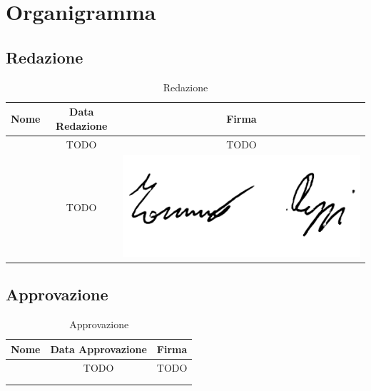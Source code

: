 \section{Organigramma}

\subsection{Redazione}

\renewcommand{\arraystretch}{1}
	\begin{table}[H]
		\begin{center}
			\setlength{\aboverulesep}{0pt}
			\setlength{\belowrulesep}{0pt}
			\setlength{\extrarowheight}{.75ex}
			\begin{tabular}{ c c c }
				\rowcolor{AzzurroGruppo!30} 
				\textbf{Nome} & \textbf{Data Redazione} & \textbf{Firma} \\
				\toprule
				
				\Matteo{} & TODO & TODO \\
                \Tommaso{} & TODO & \includegraphics[scale = 0.5]{components/img/firme_membri/firma-tp.png} \\
				
				\bottomrule
			\end{tabular}
			\caption{Redazione}
		\end{center}
	\end{table}

\subsection{Approvazione}

\renewcommand{\arraystretch}{1}
	\begin{table}[H]
		\begin{center}
			\setlength{\aboverulesep}{0pt}
			\setlength{\belowrulesep}{0pt}
			\setlength{\extrarowheight}{.75ex}
			\begin{tabular}{ c c c}
				\rowcolor{AzzurroGruppo!30} 
				\textbf{Nome} & \textbf{Data Approvazione} & \textbf{Firma} \\
				\toprule
				
				\Francesco{} & TODO & TODO \\
                \Tullio{} & & \\
                \Riccardo{} & & \\
				
				\bottomrule
			\end{tabular}
			\caption{Approvazione}
		\end{center}
    \end{table}

